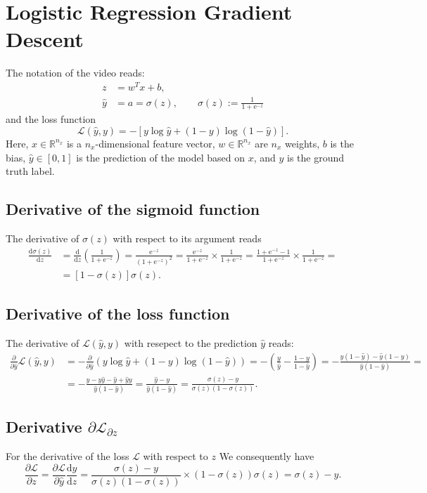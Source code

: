 \documentclass[a4paper,11pt]{article}
\newcommand{\of}[1]{\left( {#1} \right)}
\newcommand{\ofs}[1]{\left[ {#1} \right]}
\newcommand{\fracd}[2]{\frac{\dd{}{#1}}{\dd{}{#2}}}
\newcommand{\fracp}[2]{\frac{\partial{}{#1}}{\partial{}{#2}}}
\newcommand{\dd}{\text{d}}
\newcommand{\ee}{\text{e}}
\begin{document}
\section*{Logistic Regression Gradient Descent}
The notation of the video reads:
\[
\begin{split}
z & = w^T x + b,\\
\hat y &= a = \sigma\of{z}, \qquad \sigma\of{z} := \frac{1}{1 + \ee^{-z}}
\end{split}
\]
and the loss function
\[
\mathcal{L}\of{\hat{y}, y} = - \ofs{y \log\hat{y} + \of{1 - y} \log \of {1 - \hat{y}}}.
\]
Here, $x \in \mathbb{R}^{n_x}$ is a $n_x$-dimensional feature vector,
$w \in \mathbb{R}^{n_x}$ are $n_x$ weights, $b$ is the bias, $\hat{y}
\in [0, 1]$ is the prediction of the model based on $x$, and $y$ is
the ground truth label.

\subsection*{Derivative of the sigmoid function}
The derivative of $\sigma\of{z}$ with respect to its argument reads
\[
\begin{split}
\fracd{\sigma\of{z}}{z} &= \fracd{}{z}\of{\frac{1}{1 + \ee^{-z}}}
                        = \frac{\ee^{-z}}{\of{1 + \ee^{-z}}^2}
                        = \frac{\ee^{-z}}{1 + \ee^{-z}} \times \frac{1}{1 + \ee^{-z}}
                        = \frac{1 + \ee^{-z} - 1}{1 + \ee^{-z}} \times \frac{1}{1 + \ee^{-z}} =\\
                        &= \ofs{1 - \sigma\of{z}} \sigma\of{z}.
\end{split}
\]

\subsection*{Derivative of the loss function}
The derivative of $\mathcal{L}\of{\hat{y}, y}$ with resepect to the prediction $\hat{y}$ reads:
\[
\begin{split}
\fracp{}{\hat{y}} \mathcal{L}\of{\hat{y}, y} &=
- \fracp{}{\hat{y}} \of{y \log\hat{y} + \of{1 - y} \log\of{1 - \hat{y}}} =
- \of{\frac{y}{\hat{y}} - \frac{1 - y}{1 - \hat{y}}} =
- \frac{y\of{1-\hat{y}} - \hat{y}\of{1-y}}{\hat{y}\of{1 - \hat{y}}} = \\
&=
- \frac{y - y\hat{y} - \hat{y} + \hat{y}y}{\hat{y}\of{1 - \hat{y}}} =
  \frac{\hat{y} - y}{\hat{y}\of{1 - \hat{y}}} =
  \frac{\sigma\of{z} - y}{\sigma\of{z}\of{1 - \sigma\of{z}}}.
\end{split}
\]

\subsection*{Derivative $\partial\mathcal{L}_{\partial z}$}
For the derivative of the loss $\mathcal{L}$ with respect to $z$ We
consequently have
\[
\fracp{\mathcal{L}}{z} =
\fracp{\mathcal{L}}{\hat{y}} \fracd{\hat{y}}{z} =
\frac{\sigma\of{z} - y}{\sigma\of{z}\of{1 - \sigma\of{z}}} \times \of{1 - \sigma\of{z}}\sigma\of{z} = 
\sigma\of{z} - y.
\]
\end{document}

